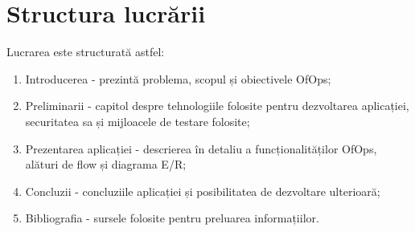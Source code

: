 \section{Structura lucrării}

Lucrarea este structurată astfel:
\begin{enumerate}[left=1.5cm]
    \item Introducerea - prezintă problema, scopul și obiectivele OfOps;
    \item Preliminarii - capitol despre tehnologiile folosite pentru dezvoltarea aplicației, securitatea sa și mijloacele de testare folosite;
    \item Prezentarea aplicației - descrierea în detaliu a funcționalităților OfOps, alături de flow și diagrama E/R;
    \item Concluzii - concluziile aplicației și posibilitatea de dezvoltare ulterioară;
    \item Bibliografia - sursele folosite pentru preluarea informațiilor.
\end{enumerate}
